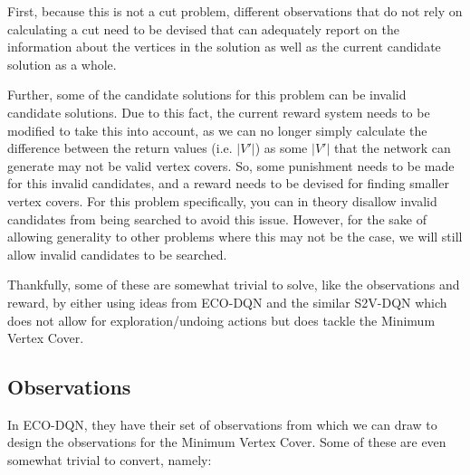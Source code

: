 \documentclass{article}
\begin{document}
First, because this is not a cut problem, different observations that do not rely on calculating a cut need to be devised that can adequately report on the information about the vertices in the solution as well as the current candidate solution as a whole. 

Further, some of the candidate solutions for this problem can be invalid candidate solutions. Due to this fact, the current reward system needs to be modified to take this into account, as we can no longer simply calculate the difference between the return values (i.e. $|V'|$) as some $|V'|$ that the network can generate may not be valid vertex covers. So, some punishment needs to be made for this invalid candidates, and a reward needs to be devised for finding smaller vertex covers. For this problem specifically, you can in theory disallow invalid candidates from being searched to avoid this issue. However, for the sake of allowing generality to other problems where this may not be the case, we will still allow invalid candidates to be searched. 

Thankfully, some of these are somewhat trivial to solve, like the observations and reward, by either using ideas from ECO-DQN \cite{eco-dqn} and the similar S2V-DQN \cite{s2v-dqn} which does not allow for exploration/undoing actions but does tackle the Minimum Vertex Cover.

\subsection{Observations}

In ECO-DQN, they have their set of observations from which we can draw to design the observations for the Minimum Vertex Cover. Some of these are even somewhat trivial to convert, namely:
\end{document}
